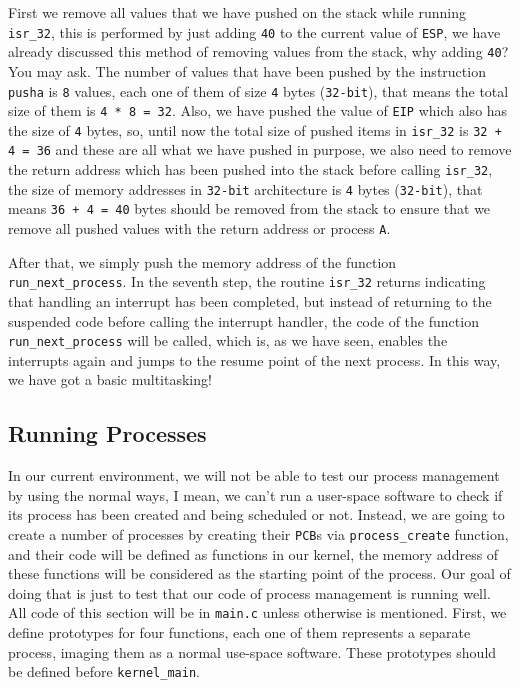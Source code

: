 First we remove all values that we have pushed on the stack while
running \lstinline!isr_32!, this is performed by just adding
\lstinline!40! to the current value of \lstinline!ESP!, we have already
discussed this method of removing values from the stack, why adding
\lstinline!40!? You may ask. The number of values that have been pushed
by the instruction \lstinline!pusha! is \lstinline!8! values, each one
of them of size \lstinline!4! bytes (\lstinline!32-bit!), that means the
total size of them is \lstinline!4 * 8 = 32!. Also, we have pushed the
value of \lstinline!EIP! which also has the size of \lstinline!4! bytes,
so, until now the total size of pushed items in \lstinline!isr_32! is
\lstinline!32 + 4 = 36! and these are all what we have pushed in
purpose, we also need to remove the return address which has been pushed
into the stack before calling \lstinline!isr_32!, the size of memory
addresses in \lstinline!32-bit! architecture is \lstinline!4! bytes
(\lstinline!32-bit!), that means \lstinline!36 + 4 = 40! bytes should be
removed from the stack to ensure that we remove all pushed values with
the return address or process \lstinline!A!.

After that, we simply push the memory address of the function
\lstinline!run_next_process!. In the seventh step, the routine
\lstinline!isr_32! returns indicating that handling an interrupt has
been completed, but instead of returning to the suspended code before
calling the interrupt handler, the code of the function
\lstinline!run_next_process! will be called, which is, as we have seen,
enables the interrupts again and jumps to the resume point of the next
process. In this way, we have got a basic multitasking!

\subsection{Running Processes}\label{running-processes}

In our current environment, we will not be able to test our process
management by using the normal ways, I mean, we can't run a user-space
software to check if its process has been created and being scheduled or
not. Instead, we are going to create a number of processes by creating
their \lstinline!PCB!s via \lstinline!process_create! function, and
their code will be defined as functions in our kernel, the memory
address of these functions will be considered as the starting point of
the process. Our goal of doing that is just to test that our code of
process management is running well. All code of this section will be in
\lstinline!main.c! unless otherwise is mentioned. First, we define
prototypes for four functions, each one of them represents a separate
process, imaging them as a normal use-space software. These prototypes
should be defined before \lstinline!kernel_main!.

